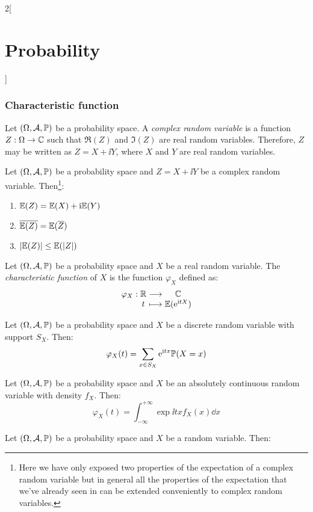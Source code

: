 \documentclass[../../../main_math.tex]{subfiles}
\begin{document}
\begin{multicols}{2}[\section{Probability}]
  \subsubsection{Characteristic function}
  \begin{definition}
    Let $(\Omega,\mathcal{A},\mathbb{P})$ be a probability space. A \emph{complex random variable} is a function $Z:\Omega\rightarrow\mathbb{C}$ such that $\Re(Z)$ and $\Im(Z)$ are real random variables. Therefore, $Z$ may be written as $Z=X+\ii Y$, where $X$ and $Y$ are real random variables.
  \end{definition}
  \begin{proposition}
    Let $(\Omega,\mathcal{A},\mathbb{P})$ be a probability space and $Z=X+\ii Y$ be a complex random variable. Then\footnote{Here we have only exposed two properties of the expectation of a complex random variable but in general all the properties of the expectation that we've already seen in  can be extended conveniently to complex random variables.}:
    \begin{enumerate}
      \item $\mathbb{E}(Z)=\mathbb{E}(X)+\mathrm{i}\mathbb{E}(Y)$
      \item $\overline{\mathbb{E}(Z)}=\mathbb{E}(\overline{Z})$
      \item $|\mathbb{E}(Z)|\leq \mathbb{E}(|Z|)$
    \end{enumerate}
  \end{proposition}
  \begin{definition}
    Let $(\Omega,\mathcal{A},\mathbb{P})$ be a probability space and $X$ be a real random variable. The \emph{characteristic function} of $X$ is the function $\varphi_X$ defined as:
    $$\function{\varphi_X}{\RR}{\CC}{t}{\Exp(\exp{\ii tX})}$$
  \end{definition}
  \begin{proposition}
    Let $(\Omega,\mathcal{A},\mathbb{P})$ be a probability space and $X$ be a discrete random variable with support $S_X$. Then:
    $$\varphi_X(t)=\sum_{x\in S_X}\mathrm{e}^{\mathrm{i} tx}\mathbb{P}(X=x)$$
  \end{proposition}
  \begin{proposition}
    Let $(\Omega,\mathcal{A},\mathbb{P})$ be a probability space and $X$ be an absolutely continuous random variable with density $f_X$. Then:
    $$\varphi_X(t)=\int_{-\infty}^{+\infty}\exp{\ii tx}f_X(x)\dd{x}$$
  \end{proposition}
  \begin{proposition}
    Let $(\Omega,\mathcal{A},\mathbb{P})$ be a probability space and $X$ be a random variable. Then:

\end{proposition}
\end{multicols}
\end{document}

